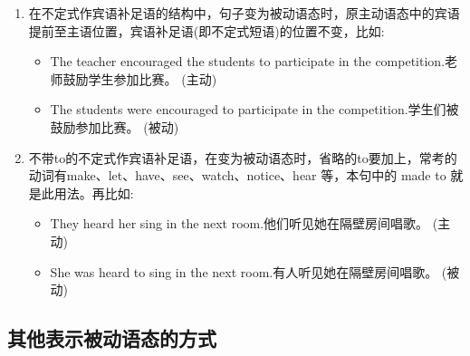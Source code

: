 \begin{enumerate}
  \item 在不定式作宾语补足语的结构中，句子变为被动语态时，原主动语态中的宾语提前至主语位置，宾语补足语(即不定式短语)的位置不变，比如:
        \begin{itemize}
          \item The teacher encouraged the students to participate in the competition.老师鼓励学生参加比赛。 (主动)
          \item The students were encouraged to participate in the competition.学生们被鼓励参加比赛。 (被动)
        \end{itemize}
  \item 不带to的不定式作宾语补足语，在变为被动语态时，省略的to要加上，常考的动词有make、let、have、see、watch、notice、hear 等，本句中的 made to 就是此用法。再比如:
        \begin{itemize}
          \item They heard her sing in the next room.他们听见她在隔壁房间唱歌。 (主动)
          \item She was heard to sing in the next room.有人听见她在隔壁房间唱歌。 (被动)
        \end{itemize}
\end{enumerate}

\subsection{其他表示被动语态的方式}

